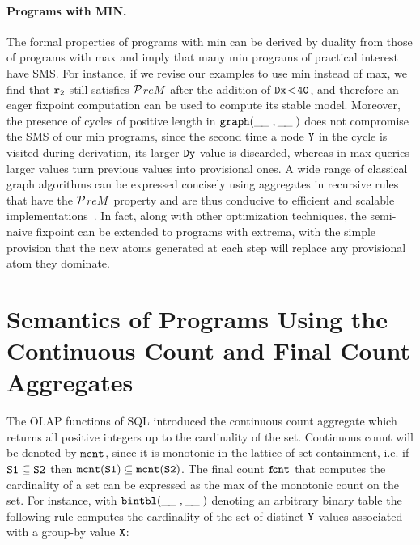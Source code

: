 \documentclass[11pt]{article}
\def\inv{\vspace{-0.2cm}}
\def\sinv{\vspace{-0.1cm}}
\def\inv{\vspace{-0.2cm}}
\def\sinv{\vspace{-0.1cm}}
\def\rof#1{$\tt r_{#1}$}
\def\prem{$\cal P$$\!reM$~}
\def\f--{\tt{ \_\!\_\;}}
\begin{document}
\sinv\paragraph{Programs with MIN.}
The formal properties of programs with min can be derived by duality from those of programs with max
and imply that  many min programs of practical interest  have SMS. For instance, if we revise our examples
to use min instead of max,  we find that \rof{2} still satisfies \prem after the addition of  $\tt Dx \!< \! 40$, and therefore
an eager fixpoint computation can be used to compute its stable model.  Moreover, the presence
of cycles of positive length  in $\tt graph(\f--, \f--)$ does not compromise the SMS of our min programs, since the second time
a node $\tt Y$ in the cycle is visited during  derivation, its larger $\tt Dy$ value is discarded, 
whereas  in max  queries larger values turn previous values into provisional ones.  
 A wide  range of classical graph algorithms can be expressed concisely 
 using aggregates in recursive  rules that  have the \prem property  and are thus
 conducive to efficient and scalable implementations~\cite{bigdatalog,bigdatalog-mc,rasql,rasqldemoSigmod20}.
In fact, along with other optimization techniques, the  semi-naive fixpoint can be extended to programs with extrema,
with the simple provision  that the new atoms generated  at each step will
replace any provisional atom they dominate.

\inv\section{{\large Semantics of Programs Using the Continuous Count and Final Count Aggregates}}

\sinv 
 The OLAP functions of SQL  introduced the 
 continuous count aggregate 
which returns all positive integers up to the cardinality of the set. 
 Continuous count will be denoted by $\tt mcnt$, since it is monotonic in the lattice
of set containment, i.e. if $\tt S1 \subseteq S2$ then $\tt mcnt(S1) \subseteq mcnt(S2)$.
The  final count $\tt f\!cnt$ that computes the cardinality of  a set
can be expressed as the max of the monotonic count on the set.
For instance, with  $\tt bintbl(\f--, \f--)$ denoting an arbitrary binary table the following rule 
computes the cardinality of the set of
distinct  $\tt Y$-values associated with a group-by value $\tt X$:
\end{document}
